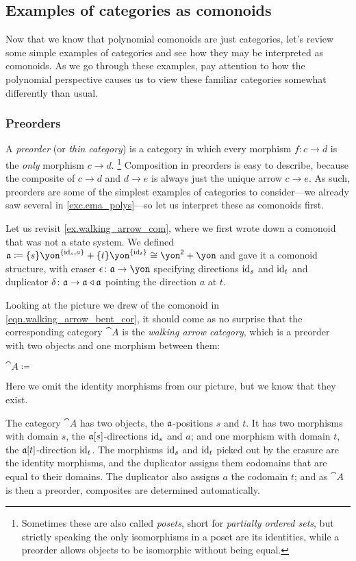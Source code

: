 \documentclass[Book-Poly]{subfiles}
\begin{document}
\subsection{Examples of categories as comonoids}
Now that we know that polynomial comonoids are just categories, let's review some simple examples of categories and see how they may be interpreted as comonoids.
As we go through these examples, pay attention to how the polynomial perspective causes us to view these familiar categories somewhat differently than usual. 

\subsubsection{Preorders}

A \emph{preorder} (or \emph{thin category}) is a category in which every morphism $f\colon c\to d$ is the \emph{only} morphism $c\to d$.%
\footnote{Sometimes these are also called \emph{posets}, short for \emph{partially ordered sets}, but strictly speaking the only isomorphisms in a poset are its identities, while a preorder allows objects to be isomorphic without being equal.}
Composition in preorders is easy to describe, because the composite of $c\to d$ and $d\to e$ is always just the unique arrow $c\to e$.
As such, preorders are some of the simplest examples of categories to consider---we already saw several in \cref{exc.ema_polys}---so let us interpret these as comonoids first.

\begin{example}\label{ex.walking_arrow_cat}
Let us revisit \cref{ex.walking_arrow_com}, where we first wrote down a comonoid that was not a state system.
We defined $\car{a}\coloneqq\{s\}\yon^{\{\id_s,a\}}+\{t\}\yon^{\{\id_t\}}\iso\yon^\2+\yon$ and gave it a comonoid structure, with eraser $\epsilon\colon\car{a}\to\yon$ specifying directions $\mathrm{id}_s$ and $\mathrm{id}_t$ and duplicator $\delta\colon\mathfrak{a}\to\mathfrak{a}\mathbin{\triangleleft}\mathfrak{a}$ pointing the direction $a$ at $t$.

Looking at the picture we drew of the comonoid in \eqref{eqn.walking_arrow_bent_cor}, it should come as no surprise that the corresponding category $\cat{A}$ is the \emph{walking arrow category}, which is a preorder with two objects and one morphism between them:
\begin{center}
    $\cat{A}\coloneqq\:$
\end{center}
Here we omit the identity morphisms from our picture, but we know that they exist.

The category $\cat{A}$ has two objects, the $\mathfrak{a}$-positions $s$ and $t$.
It has two morphisms with domain $s$, the $\mathfrak{a}[s]$-directions $\mathrm{id}_s$ and $a$; and one morphism with domain $t$, the $\mathfrak{a}[t]$-direction $\mathrm{id}_t$.
The morphisms $\mathrm{id}_s$ and $\mathrm{id}_t$ picked out by the erasure are the identity morphisms, and the duplicator assigns them codomains that are equal to their domains.
The duplicator also assigns $a$ the codomain $t$; and as $\cat{A}$ is then a preorder, composites are determined automatically.
\end{example}
\end{document}
